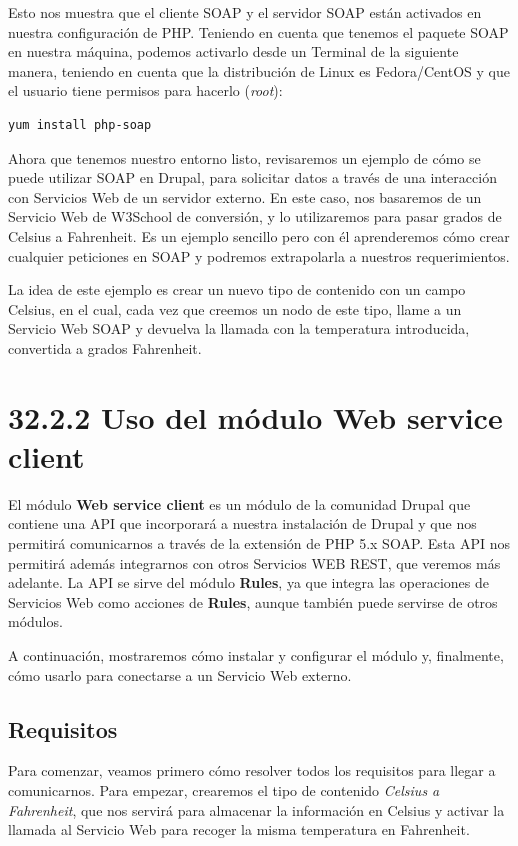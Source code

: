 Esto nos muestra que el cliente SOAP y el servidor SOAP están activados en nuestra configuración de PHP. 
Teniendo en cuenta que tenemos el paquete SOAP en nuestra máquina, podemos activarlo desde un Terminal 
de la siguiente manera, teniendo en cuenta que la distribución de Linux es Fedora/CentOS y que el usuario tiene 
permisos para hacerlo (\textit{root}):

\begin{verbatim}
yum install php-soap
\end{verbatim}

Ahora que tenemos nuestro entorno listo, revisaremos un ejemplo de cómo se puede utilizar SOAP en Drupal, 
para solicitar datos a través de una interacción con Servicios Web de un servidor externo. En este caso, 
nos basaremos de un Servicio Web de W3School de conversión, y lo utilizaremos para pasar grados de Celsius a 
Fahrenheit. Es un ejemplo sencillo pero con él aprenderemos cómo crear cualquier peticiones en SOAP y 
podremos extrapolarla a nuestros requerimientos.

La idea de este ejemplo es crear un nuevo tipo de contenido con un campo Celsius, en el cual, cada vez que 
creemos un nodo de este tipo, llame a un Servicio Web SOAP y devuelva la llamada con la temperatura introducida, 
convertida a grados Fahrenheit.

\section{\Large{32.2.2 Uso del módulo Web service client}}

El módulo \textbf{Web service client} es un módulo de la comunidad Drupal que contiene una API que incorporará 
a nuestra instalación de Drupal y que nos permitirá comunicarnos a través de la extensión de PHP 5.x SOAP. Esta 
API nos permitirá además integrarnos con otros Servicios WEB REST, que veremos más adelante. La API se sirve 
del módulo \textbf{Rules}, ya que integra las operaciones de Servicios Web como acciones de \textbf{Rules},  
aunque también puede servirse de otros módulos. 
  
A continuación, mostraremos cómo instalar y configurar el módulo y, finalmente, cómo usarlo para conectarse a 
un Servicio Web externo.

\subsection{\large{Requisitos}}

Para comenzar, veamos primero cómo resolver todos los requisitos para llegar a comunicarnos. Para empezar, crearemos 
el tipo de contenido \textit{Celsius a Fahrenheit}, que nos servirá para almacenar la información en Celsius y 
activar la llamada al Servicio Web para recoger la misma temperatura en Fahrenheit.


